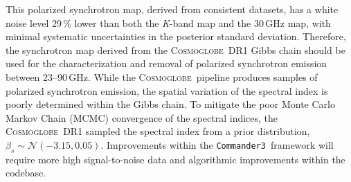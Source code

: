 \documentclass[twocolumn]{../../common/aa}
\def\commanderthree{\texttt{Commander3}}
\newcommand{\cosmoglobe}{\textsc{Cosmoglobe}}
\newcommand{\K}[0]{\textit K}
\begin{document}
This polarized synchrotron map, derived from consistent datasets, has a white noise level 29\,\% lower than both the \K-band map and the 30\,GHz map, with minimal systematic uncertainties in the posterior standard deviation. Therefore, the synchrotron map derived from the \cosmoglobe\ DR1 Gibbs chain should be used for the characterization and removal of polarized synchrotron emission between 23--90\,GHz.
While the \cosmoglobe\ pipeline produces samples of polarized synchrotron emission, the spatial variation of the spectral index is poorly determined within the Gibbs chain. To mitigate the poor Monte Carlo Markov Chain (MCMC) convergence of the spectral indices, the \cosmoglobe\ DR1 sampled the spectral index from a prior distribution, $\beta_s\sim\mathcal N(-3.15, 0.05)$. Improvements within the \commanderthree\ framework will require more high signal-to-noise data and algorithmic improvements within the codebase.
\end{document}
